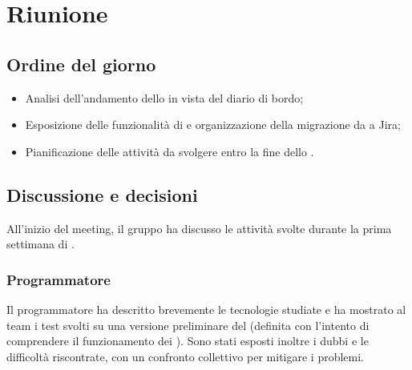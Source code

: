 \section{Riunione}
\subsection{Ordine del giorno}
\begin{itemize}
	\item Analisi dell'andamento dello  in vista del diario di bordo;
	\item Esposizione delle funzionalità di  e organizzazione della migrazione da  a Jira;
	\item Pianificazione delle attività da svolgere entro la fine dello .
\end{itemize}

\subsection{Discussione e decisioni}
\par All'inizio del meeting, il gruppo ha discusso le attività svolte durante la prima settimana di .

\subsubsection{Programmatore} \label{sec:programmatore}
\par Il programmatore ha descritto brevemente le tecnologie studiate e ha mostrato al team i test svolti su una versione preliminare del  (definita con l'intento di comprendere il funzionamento dei ). Sono stati esposti inoltre i dubbi e le difficoltà riscontrate, con un confronto collettivo per mitigare i problemi.

